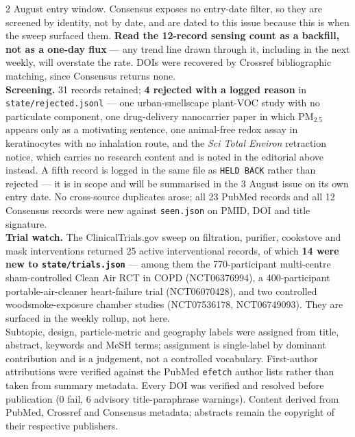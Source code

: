 \documentclass[10pt]{article}
\begin{document}
\begin{keybox}
{{2 August entry window.} Consensus exposes no entry-date filter, so they are screened by
identity, not by date, and are dated to this issue because this is when the sweep surfaced
them. \textbf{Read the 12-record sensing count as a backfill, not as a one-day flux} ---
any trend line drawn through it, including in the next weekly, will overstate the rate.
DOIs were recovered by Crossref bibliographic matching, since Consensus returns none.
\\[1.0mm]
\textbf{Screening.} 31 records retained; \textbf{4 rejected with a logged reason} in
\texttt{state/rejected.jsonl} --- one urban-smellscape plant-VOC study with no particulate
component, one drug-delivery nanocarrier paper in which PM$_{2.5}$ appears only as a
motivating sentence, one animal-free redox assay in keratinocytes with no inhalation
route, and the \textit{Sci Total Environ} retraction notice, which carries no research
content and is noted in the editorial above instead. A fifth record is logged in the same
file as \texttt{HELD BACK} rather than rejected --- it is in scope and will be summarised
in the 3 August issue on its own entry date. No cross-source duplicates arose; all 23
PubMed records and all 12 Consensus records were new against \texttt{seen.json} on PMID,
DOI and title signature.
\\[1.0mm]
\textbf{Trial watch.} The ClinicalTrials.gov sweep on filtration, purifier, cookstove and
mask interventions returned 25 active interventional records, of which \textbf{14 were new
to \texttt{state/trials.json}} --- among them the 770-participant multi-centre sham-controlled
Clean Air RCT in COPD (NCT06376994), a 400-participant portable-air-cleaner heart-failure
trial (NCT06070428), and two controlled woodsmoke-exposure chamber studies
(NCT07536178, NCT06749093). They are surfaced in the weekly rollup, not here.
\\[1.0mm]
Subtopic, design, particle-metric and geography labels were assigned from title, abstract,
keywords and MeSH terms; assignment is single-label by dominant contribution and is a
judgement, not a controlled vocabulary. First-author attributions were verified against
the PubMed \texttt{efetch} author lists rather than taken from summary metadata. Every DOI
was verified and resolved before publication (0 fail, 6 advisory title-paraphrase
warnings). Content derived from PubMed, Crossref and Consensus metadata; abstracts remain
the copyright of their respective publishers.\par}
\end{keybox}
\end{document}
